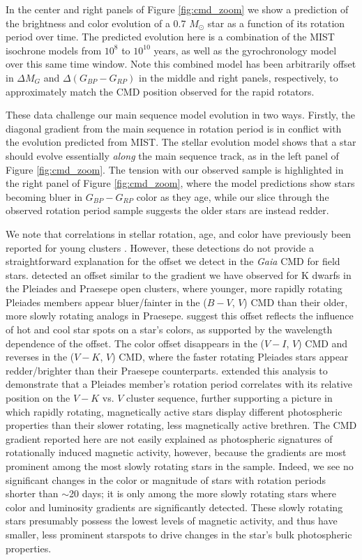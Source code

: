 \documentclass[trackchanges,preprint2]{aastex62}
\begin{document}
In the center and right panels of Figure \ref{fig:cmd_zoom} we show a prediction of the brightness and color evolution of a 0.7 $M_\odot$ star as a function of its rotation period over time. The predicted evolution here is a combination of the MIST isochrone models from $10^8$ to $10^{10}$ years, as well as the \citet{meibom2009} gyrochronology model over this same time window. Note this  combined model has been arbitrarily offset in $\Delta M_G$ and $\Delta(G_{BP} - G_{RP})$ in the middle and right panels, respectively, to approximately match the CMD position observed for the rapid rotators. 

These data challenge our main sequence model evolution in two ways. Firstly, the diagonal gradient from the main sequence in rotation period is in conflict with the evolution predicted from MIST. The stellar evolution model shows that a star should evolve essentially {\it along} the main sequence track, as in the left panel of Figure \ref{fig:cmd_zoom}. The tension with our observed sample is highlighted in the right panel of Figure \ref{fig:cmd_zoom}, where the model predictions show stars becoming bluer in $G_{BP}-G_{RP}$ color as they age, while our slice through the observed rotation period sample suggests the older stars are instead redder.


We note that correlations in stellar rotation, age, and color have previously been reported for young clusters \citep[e.g.][]{stauffer2003,covey2016}.
However, these detections do not provide a straightforward explanation for the offset we detect in the {\em Gaia} CMD for field stars.
\citet{stauffer2003} detected an offset similar to the gradient we have observed for K dwarfs in the Pleiades and Praesepe open clusters, where younger, more rapidly rotating Pleiades members appear bluer/fainter in the ($B-V$, $V$) CMD than their older, more slowly rotating analogs in Praesepe.  
\citet{stauffer2003} suggest this offset reflects the influence of hot and cool star spots on a star's colors, as supported by the wavelength dependence of the offset. The color offset disappears in the ($V-I$, $V$) CMD and reverses in the ($V-K$, $V$) CMD, where the faster rotating Pleiades stars appear redder/brighter than their Praesepe counterparts.  
\citet{covey2016} extended this analysis to demonstrate that a Pleiades member's rotation period correlates with its relative position on the $V-K$ vs. $V$ cluster sequence, further supporting a picture in which rapidly rotating, magnetically active stars display different photospheric properties than their slower rotating, less magnetically active brethren.  The CMD gradient reported here are not easily explained as photospheric signatures of rotationally induced magnetic activity, however, because the gradients are most prominent among the most slowly rotating stars in the sample.  Indeed, we see no significant changes in the color or magnitude of stars with rotation periods shorter than $\sim$20 days; it is only among the more slowly rotating stars where color and luminosity gradients are significantly detected.  These slowly rotating stars presumably possess the lowest levels of magnetic activity, and thus have smaller, less prominent starspots to drive changes in the star's bulk photospheric properties. 
\end{document}
